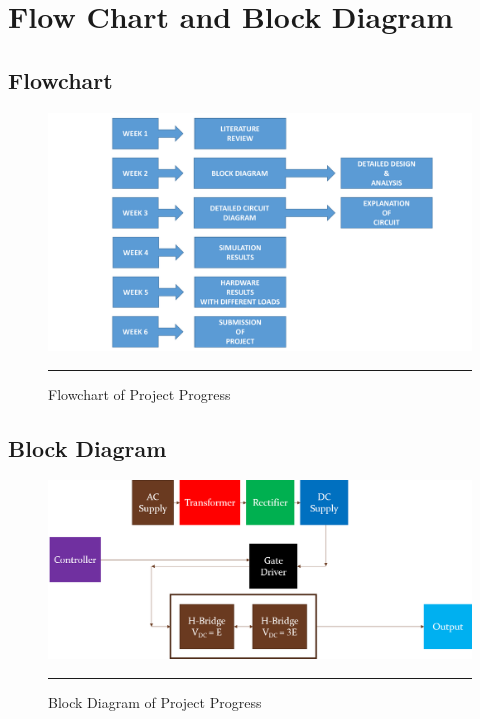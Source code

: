
\chapter{Flow Chart and Block Diagram} %
\label{Chapter2}
\section{Flowchart}

\begin{figure}[htbp]
	\centering
		\includegraphics[width = 7in]{./Figures/Presentation1.pdf}
		\rule{35em}{5pt}
	\caption{Flowchart of Project Progress}
	\label{fig:1}
\end{figure}
\newpage
\section{Block Diagram}
\begin{figure}[htbp]
	\centering
		\includegraphics[width = 5in]{./Figures/block}
		\rule{35em}{5pt}
	\caption{Block Diagram of Project Progress}
	\label{fig:2}
\end{figure}